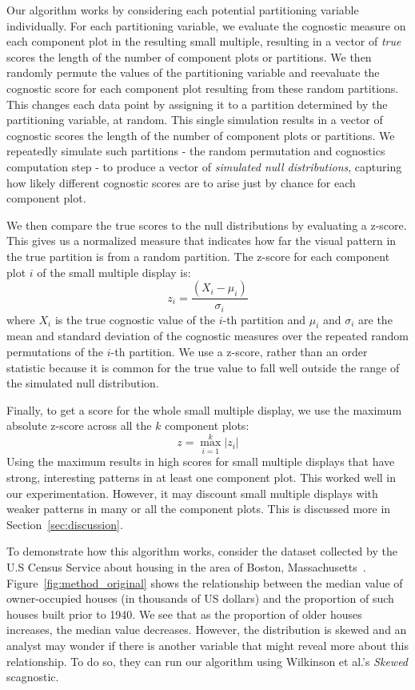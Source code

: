 Our algorithm works by considering each potential partitioning variable individually. For each partitioning variable, we evaluate the cognostic measure on each component plot in the resulting small multiple, resulting in a vector of \emph{true} scores the length of the number of component plots or partitions. We then randomly permute the values of the partitioning variable and reevaluate the cognostic score for each component plot resulting from these random partitions. This changes each data point by assigning it to a partition determined by the partitioning variable, at random. This single simulation results in a vector of cognostic scores the length of the number of component plots or partitions. We repeatedly simulate such partitions - the random permutation and cognostics computation step - to produce a vector of \emph{simulated null distributions}, capturing how likely different cognostic scores are to arise just by chance for each component plot.

We then compare the true scores to the null distributions by evaluating a z-score. This gives us a normalized measure that indicates how far the visual pattern in the true partition is from a random partition. The z-score for each component plot $i$ of the small multiple display is:
$$z_i = \frac{(X_i-\mu_i)}{\sigma_i}$$ 
where $X_i$ is the true cognostic value of the $i$-th partition and $\mu_i$ and $\sigma_i$ are the mean and standard deviation of the cognostic measures over the repeated random permutations of the $i$-th partition. We use a z-score, rather than an order statistic because it is common for the true value to fall well outside the range of the simulated null distribution.

Finally, to get a score for the whole small multiple display, we use the maximum absolute z-score across all the $k$ component plots: 
$$z = \max_{i=1}^k |z_i|$$
Using the maximum results in high scores for small multiple displays that have strong, interesting patterns in at least one component plot. This worked well in our experimentation. However, it may discount small multiple displays with weaker patterns in many or all the component plots. This is discussed more in Section~\ref{sec:discussion}. 

To demonstrate how this algorithm works, consider the dataset
collected by the U.S Census Service about housing in the area of Boston, Massachusetts~\cite{Harrison1978}. Figure~\ref{fig:method_original} shows the relationship between the median value of owner-occupied houses (in thousands of US dollars) and the proportion of such houses built prior to 1940. We see that as the proportion of older houses increases, the median value decreases. However, the distribution is skewed and an analyst may wonder if there is another variable that might reveal more about this relationship.
To do so, they can run our algorithm using Wilkinson et al.'s \emph{Skewed} scagnostic.

